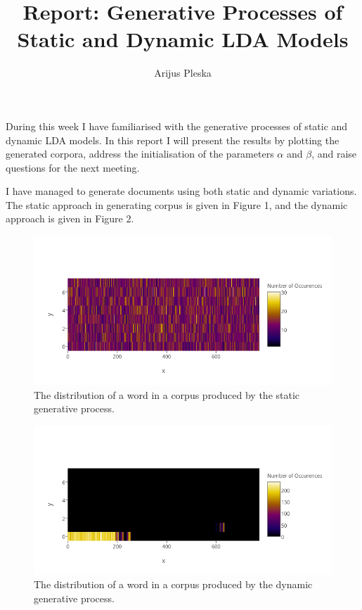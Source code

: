\documentclass{article}
\begin{document}
\title{Report: Generative Processes of Static and Dynamic LDA Models}
\author{Arijus Pleska}
\maketitle


\par During this week I have familiarised with the generative processes of static and dynamic LDA models. In this report I will present the results by plotting the generated corpora, address the initialisation of the parameters $\alpha$ and $\beta$, and raise questions for the next meeting.

\par I have managed to generate documents using both static and dynamic variations. The static approach in generating corpus is given in Figure 1, and the dynamic approach is given in Figure 2.

\begin{figure}[H]
  \centering
  \includegraphics[width=\textwidth]{static}
  \caption{The distribution of a word in a corpus produced by the static generative process.}
  \label{fig:static}
\end{figure}

\begin{figure}[H]
  \centering
  \includegraphics[width=\textwidth]{dynamic}
  \caption{The distribution of a word in a corpus produced by the dynamic generative process.}
  \label{fig:dynamic}
\end{figure}
\end{document}
